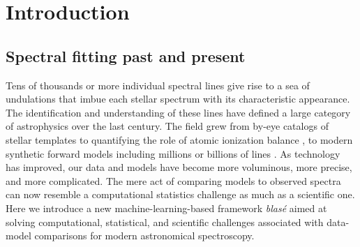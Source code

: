 \documentclass[twocolumn]{aastex631}
\begin{document}

\section{Introduction}\label{sec:intro}

\subsection{Spectral fitting past and present}

Tens of thousands or more individual spectral lines give rise to a sea of undulations that imbue each stellar spectrum with its characteristic appearance.  The identification and understanding of these lines have defined a large category of astrophysics over the last century.  The field grew from by-eye catalogs of stellar templates \citep{1901AnHar..28..129C} to quantifying the role of atomic ionization balance \citep{1925PhDT.........1P}, to modern synthetic forward models including millions or billions of lines \citep[\emph{e.g.}][]{husser13, 2021ApJ...920...85M, 2021JQSRT.26107476V}.  As technology has improved, our data and models have become more voluminous, more precise, and more complicated.  The mere act of comparing models to observed spectra can now resemble a computational statistics challenge as much as a scientific one.  Here we introduce a new machine-learning-based framework \emph{blas\'e} aimed at solving computational, statistical, and scientific challenges associated with data-model comparisons for modern astronomical spectroscopy.
\end{document}
